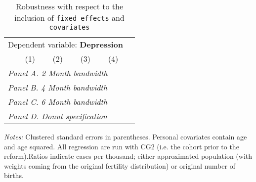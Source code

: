  \begin{table}[H] \begin{threeparttable} \centering \caption{Robustness with respect to the inclusion of \texttt{fixed effects} and \texttt{covariates}} {\def\sym#1{\ifmmode^{#1}\else\(^{#1}\)\fi} \begin{tabular}{l*{5}{c}} \toprule \multicolumn{5}{c}{Dependent variable: \textbf{Depression}} \\ \cmidrule(lr){2-5}
            &\multicolumn{1}{c}{(1)}&\multicolumn{1}{c}{(2)}&\multicolumn{1}{c}{(3)}&\multicolumn{1}{c}{(4)}\\
\midrule
 \multicolumn{5}{l}{\emph{Panel A. 2 Month bandwidth}} \\    \midrule\multicolumn{5}{l}{\emph{Panel B. 4 Month bandwidth}} \\    \midrule\multicolumn{5}{l}{\emph{Panel C. 6 Month bandwidth}} \\    \midrule\multicolumn{5}{l}{\emph{Panel D. Donut specification}} \\    \midrule  
\bottomrule \end{tabular} } \begin{tablenotes} \item \scriptsize \emph{Notes:} Clustered standard errors in parentheses. Personal covariates contain age and age squared. All regression are run with CG2 (i.e. the cohort prior to the reform).Ratios indicate cases per thousand; either approximated population (with weights coming from the original fertility distribution) or original number of births. \end{tablenotes} \end{threeparttable} \end{table} 
